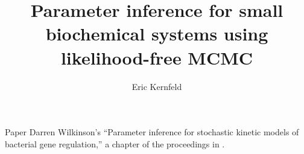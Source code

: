 \documentclass[12pt,a4paper,t,xcolor=dvipsnames,slidestop,compress,mathserif]{beamer}
\title[Likelihood-free MCMC]{Parameter inference for small biochemical systems using likelihood-free MCMC}
\author[Eric Kernfeld]{ {Eric Kernfeld}\inst{1}}
\institute[University of Washington]
{ \inst{1}%
University of Washington Department of Statistics}
\date{}
\begin{document}
\maketitle



\begin{frame}{Paper}
Darren Wilkinson's ``Parameter inference for stochastic kinetic models of bacterial gene regulation,'' a chapter of the proceedings in \cite{Bernardo2012}.

\end{frame}
\end{document}
